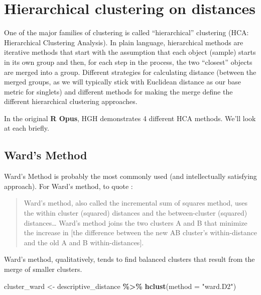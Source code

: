 \documentclass[
]{book}
\newenvironment{Shaded}{\begin{snugshade}}{\end{snugshade}}
\newcommand{\AttributeTok}[1]{\textcolor[rgb]{0.13,0.29,0.53}{#1}}
\newcommand{\FunctionTok}[1]{\textcolor[rgb]{0.13,0.29,0.53}{\textbf{#1}}}
\newcommand{\NormalTok}[1]{#1}
\newcommand{\OtherTok}[1]{\textcolor[rgb]{0.56,0.35,0.01}{#1}}
\newcommand{\SpecialCharTok}[1]{\textcolor[rgb]{0.81,0.36,0.00}{\textbf{#1}}}
\newcommand{\StringTok}[1]{\textcolor[rgb]{0.31,0.60,0.02}{#1}}
\begin{document}
\section{Hierarchical clustering on distances}\label{hierarchical-clustering-on-distances}

One of the major families of clustering is called ``hierarchical'' clustering (HCA: Hierarchical Clustering Analysis). In plain language, hierarchical methods are iterative methods that start with the assumption that each object (sample) starts in its own group and then, for each step in the process, the two ``closest'' objects are merged into a group. Different strategies for calculating distance (between the merged groups, as we will typically stick with Euclidean distance as our base metric for singlets) and different methods for making the merge define the different hierarchical clustering approaches.

In the original \textbf{R Opus}, HGH demonstrates 4 different HCA methods. We'll look at each briefly.

\subsection{Ward's Method}\label{wards-method}

Ward's Method is probably the most commonly used (and intellectually satisfying approach). For Ward's method, to quote \citet[466]{rencherMethods2002}:

\begin{quote}
Ward's method, also called the incremental sum of squares method, uses the within cluster (squared) distances and the between-cluster (squared) distances\ldots{} Ward's method joins the two clusters A and B that minimize the increase in {[}the difference between the new AB cluster's within-distance and the old A and B within-distances{]}.
\end{quote}

Ward's method, qualitatively, tends to find balanced clusters that result from the merge of smaller clusters.

\begin{Shaded}
\begin{Highlighting}[]
\NormalTok{cluster\_ward }\OtherTok{\textless{}{-}}
\NormalTok{  descriptive\_distance }\SpecialCharTok{\%\textgreater{}\%}
  \FunctionTok{hclust}\NormalTok{(}\AttributeTok{method =} \StringTok{"ward.D2"}\NormalTok{)}
\end{Highlighting}
\end{Shaded}
\end{document}
